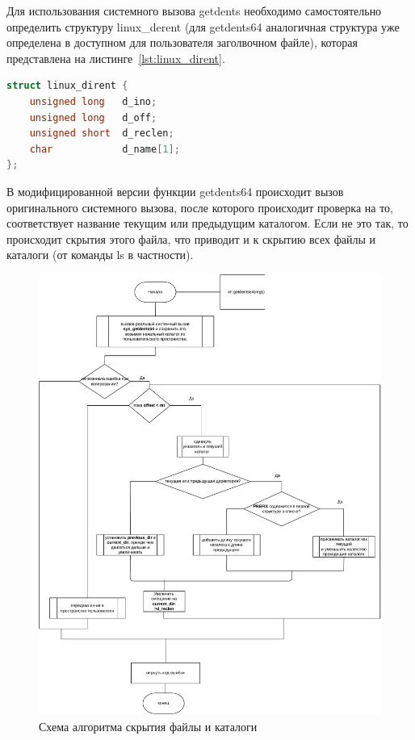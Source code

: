 Для использования системного вызова getdents необходимо самостоятельно определить структуру linux\_derent (для getdents64 аналогичная структура уже определена в доступном для пользователя заголвочном файле), которая представлена на листинге~\ref{lst:linux_dirent}.
\begin{lstlisting}[language=c,caption={Структура linux\_dirent},label=lst:linux_dirent]
struct linux_dirent {
    unsigned long	d_ino;
    unsigned long	d_off;
    unsigned short	d_reclen;
    char		    d_name[1];
};
\end{lstlisting}

В модифицированной версии функции getdents64 происходит вызов оригинального системного вызова, после которого происходит проверка на то, соответствует название текущим или предыдущим каталогом. Если не это так, то происходит скрытия этого файла, что приводит и к скрытию всех файлы и каталоги (от команды ls в частности).

\begin{figure}[H]
    \centering
    \includegraphics[scale=0.65]{pdf/os_dirent.pdf}
    \caption{Схема алгоритма скрытия файлы и каталоги}\label{img:proc_hide_scheme}
\end{figure}

